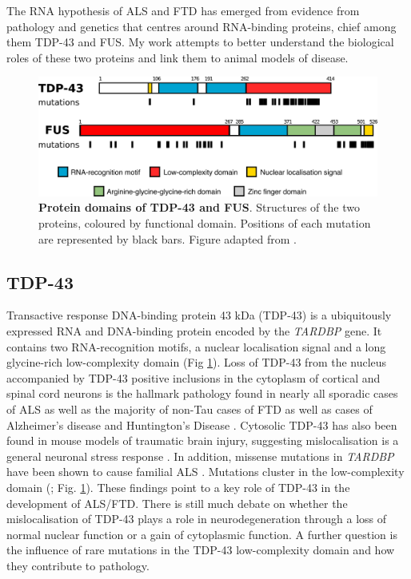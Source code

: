 The RNA hypothesis of ALS and FTD has emerged from evidence from pathology and genetics that centres around RNA-binding proteins, chief among them TDP-43 and FUS.
My work attempts to better understand the biological roles of these two proteins and link them to animal models of disease.

\begin{figure}[h!]
	\centering
	\includegraphics[width=\textwidth]{Figures/01_introduction/tdp_fus_structures.png}
	\caption[Protein domains of TDP-43 and FUS]{
		\textbf{Protein domains of TDP-43 and FUS}. Structures of the two proteins, coloured by functional domain. Positions of each mutation are represented by black bars. Figure adapted from \citep{Kapeli2017}. 
	}
	\label{fig:intro_domains}
\end{figure}


\subsection{TDP-43}

Transactive response DNA-binding protein 43 kDa (TDP-43) is a ubiquitously expressed RNA and DNA-binding protein encoded by the \emph{TARDBP} gene. 
It contains two RNA-recognition motifs, a nuclear localisation signal and a long glycine-rich low-complexity domain (Fig \ref{fig:intro_domains}).
Loss of TDP-43 from the nucleus accompanied by TDP-43 positive inclusions in the cytoplasm of cortical and spinal cord neurons is the hallmark pathology found in nearly all sporadic cases of ALS as well as the majority of non-Tau cases of FTD \citep{Neumann2006,Arai2006} as well as cases of Alzheimer's disease \citep{LaClair2016} and Huntington's Disease \citep{Doi2008}. 
Cytosolic TDP-43 has also been found in mouse models of traumatic brain injury, suggesting mislocalisation is a general neuronal stress response \citep{Moisse2009}. 
In addition, missense mutations in \emph{TARDBP} have been shown to cause familial ALS \citep{Sreedharan2008-xv}.  Mutations cluster in the low-complexity domain (\citealt{Kapeli2017}; Fig. \ref{fig:intro_domains}).
These findings point to a key role of TDP-43 in the development of ALS/FTD. 
There is still much debate on whether the mislocalisation of TDP-43 plays a role in neurodegeneration through a loss of normal nuclear function or a gain of cytoplasmic function.  
A further question is the influence of rare mutations in the TDP-43 low-complexity domain and how they contribute to pathology.

